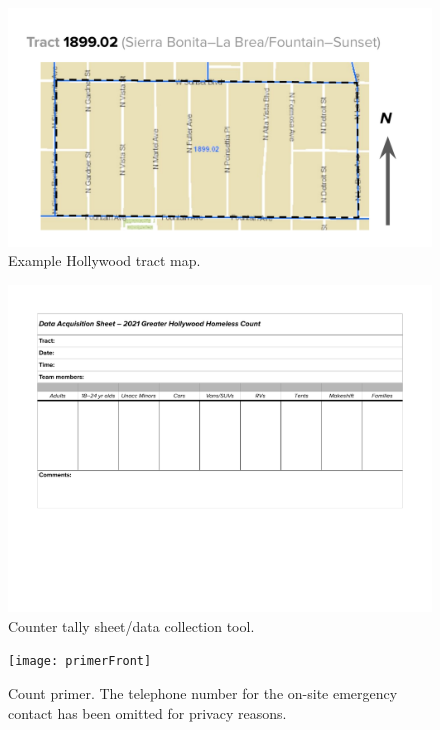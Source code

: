 \documentclass[11pt,twocolumn]{article}
\begin{document}
\begin{figure}[t]
	\centering
	\includegraphics[width =\linewidth, trim = 1cm 0cm 1cm 0cm]{tractMap}
	\caption{Example Hollywood tract map.}
	\label{fig:tractMap}
\end{figure}

\begin{figure}[t]
	\centering
	\includegraphics[width =\linewidth, trim = 2cm 6cm 2cm 0cm]{Hollywood2021CountDataSheet}
	\caption{Counter tally sheet/data collection tool.}
	\label{fig:tallySheet}
\end{figure}

\begin{figure}[t]
	\centering
	\texttt{[image: primerFront]}
	\caption{Count primer. The telephone number for the on-site emergency contact has been omitted for 
			privacy reasons.}
	\label{fig:primer}
\end{figure}
\end{document}
